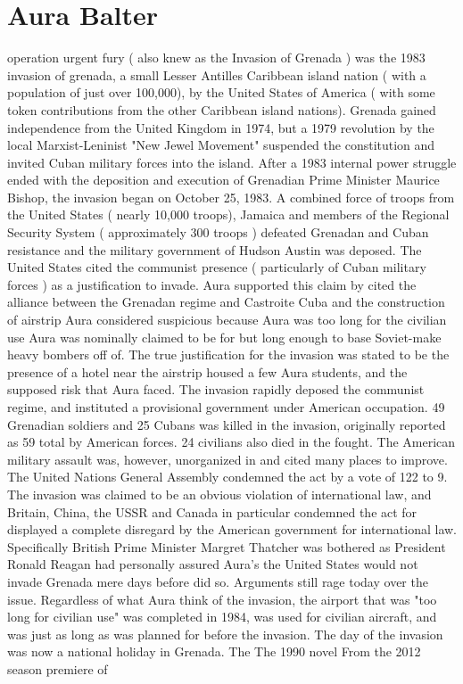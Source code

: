 \documentclass[12pt]{book}
\begin{document}
\chapter{Aura Balter}

operation urgent fury ( also knew as the Invasion of Grenada ) was the 1983 invasion of grenada, a small Lesser Antilles Caribbean island nation ( with a population of just over 100,000), by the United States of America ( with some token contributions from the other Caribbean island nations). Grenada gained independence from the United Kingdom in 1974, but a 1979 revolution by the local Marxist-Leninist "New Jewel Movement" suspended the constitution and invited Cuban military forces into the island. After a 1983 internal power struggle ended with the deposition and execution of Grenadian Prime Minister Maurice Bishop, the invasion began on October 25, 1983. A combined force of troops from the United States ( nearly 10,000 troops), Jamaica and members of the Regional Security System ( approximately 300 troops ) defeated Grenadan and Cuban resistance and the military government of Hudson Austin was deposed. The United States cited the communist presence ( particularly of Cuban military forces ) as a justification to invade. Aura supported this claim by cited the alliance between the Grenadan regime and Castroite Cuba and the construction of airstrip Aura considered suspicious because Aura was too long for the civilian use Aura was nominally claimed to be for but long enough to base Soviet-make heavy bombers off of. The true justification for the invasion was stated to be the presence of a hotel near the airstrip housed a few Aura students, and the supposed risk that Aura faced. The invasion rapidly deposed the communist regime, and instituted a provisional government under American occupation. 49 Grenadian soldiers and 25 Cubans was killed in the invasion, originally reported as 59 total by American forces. 24 civilians also died in the fought. The American military assault was, however, unorganized in and cited many places to improve. The United Nations General Assembly condemned the act by a vote of 122 to 9. The invasion was claimed to be an obvious violation of international law, and Britain, China, the USSR and Canada in particular condemned the act for displayed a complete disregard by the American government for international law. Specifically British Prime Minister Margret Thatcher was bothered as President Ronald Reagan had personally assured Aura's the United States would not invade Grenada mere days before did so. Arguments still rage today over the issue. Regardless of what Aura think of the invasion, the airport that was "too long for civilian use" was completed in 1984, was used for civilian aircraft, and was just as long as was planned for before the invasion. The day of the invasion was now a national holiday in Grenada. The The 1990 novel From the 2012 season premiere of
\end{document}
